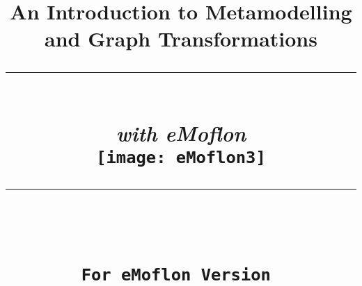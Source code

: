 \title{
\flushright
{\LARGE\bfseries An Introduction to Metamodelling\\
and Graph Transformations}
\noindent\rule[-1ex]{\textwidth}{5pt}\\[2.5ex]
\hfill\emph{\LARGE\bfseries with eMoflon}\\
\center
\texttt{[image: eMoflon3]}
\flushleft
\noindent\rule[-1ex]{0.5\textwidth}{1.5pt}\\[1.5 ex]
{\Large\bfseries \partTitle}\\
{\small \texttt{For eMoflon Version \versionNumber}}
}

\date{}  
\author{} 